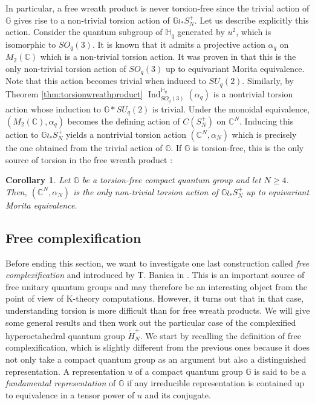 \documentclass[a4paper, 11pt]{amsart}
\theoremstyle{plain}
\newtheorem{cor}[thm]{Corollary}
\theoremstyle{definition}
\theoremstyle{remark}
\DeclareMathOperator{\Ind}{Ind}
\newcommand{\C}{\mathbb{C}}
\newcommand{\G}{\mathbb{G}}
\newcommand{\HH}{\mathbb{H}}
\begin{document}
In particular, a free wreath product is never torsion-free since the trivial action of $\G$ gives rise to a non-trivial torsion action of $\G\wr_{\ast}S_{N}^{+}$. Let us describe explicitly this action. Consider the quantum subgroup of $\HH_{q}$ generated by $u^{2}$, which is isomorphic to $SO_{q}(3)$. It is known that it admits a projective action $\alpha_{q}$ on $M_{2}(\C)$ which is a non-trivial torsion action. It was proven in \cite[Lem 4.4]{voigt2015structure} that this is the only non-trivial torsion action of $SO_{q}(3)$ up to equivariant Morita equivalence. Note that this action becomes trivial when induced to $SU_{q}(2)$. Similarly, by Theorem \ref{thm:torsionwreathproduct} $\Ind_{SO_{q}(3)}^{\HH_{q}}(\alpha_{q})$ is a nontrivial torsion action whose induction to $\G\ast SU_{q}(2)$ is trivial. Under the monoidal equivalence, $(M_{2}(\C), \alpha_{q})$ becomes the defining action of $C(S_{N}^{+})$ on $\C^{N}$. Inducing this action to $\G\wr_{\ast}S_{N}^{+}$ yields a nontrivial torsion action $(\C^{N}, \alpha_{N})$ which is precisely the one obtained from the trivial action of $\G$. If $\G$ is torsion-free, this is the only source of torsion in the free wreath product :

\begin{cor}
Let $\G$ be a torsion-free compact quantum group and let $N\geqslant 4$. Then, $(\C^{N}, \alpha_{N})$ is the only non-trivial torsion action of $\G\wr_{\ast}S_{N}^{+}$ up to equivariant Morita equivalence.
\end{cor}

\subsection{Free complexification}

Before ending this section, we want to investigate one last construction called \emph{free complexification} and introduced by T. Banica in \cite{banica2007note}. This is an important source of free unitary quantum groups and may therefore be an interesting object from the point of view of K-theory computations. However, it turns out that in that case, understanding torsion is more difficult than for free wreath products. We will give some general results and then work out the particular case of the complexified hyperoctahedral quantum group $\widetilde{H}_{N}^{+}$. We start by recalling the definition of free complexification, which is slightly different from the previous ones because it does not only take a compact quantum group as an argument but also a distinguished representation. A representation $u$ of a compact quantum group $\G$ is said to be a \emph{fundamental representation} of $\G$ if any irreducible representation is contained up to equivalence in a tensor power of $u$ and its conjugate.
\end{document}
